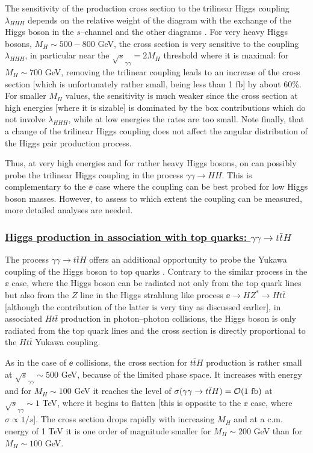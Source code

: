 The sensitivity of the production cross section to the trilinear Higgs coupling
$\lambda_{HHH}$ depends on the relative weight of the diagram with the exchange
of the Higgs boson in the $s$--channel and the other diagrams
\cite{gam-HH1}. For very heavy
Higgs bosons, $M_H \sim 500-800$ GeV, the cross section is very sensitive to the
coupling $\lambda_{HHH}$, in particular near the $\sqrt{s}_{\gamma \gamma} =2
M_H$ threshold where it is maximal: for $M_H \sim 700$ GeV, removing the
trilinear coupling leads to an increase of the cross section [which is
unfortunately rather small, being less than 1 fb] by about 60\%.  For smaller
$M_H$ values, the sensitivity is much weaker since the cross section at high
energies [where it is sizable] is dominated by the box contributions which do
not involve $\lambda_{HHH}$, while at low energies the rates are too small. 
Note finally, that a change of the trilinear Higgs coupling does not affect the
angular distribution of the Higgs pair production process. \s

Thus, at very high energies and for rather heavy Higgs bosons, on can  possibly
probe the trilinear Higgs coupling in the process $\gamma \gamma \to HH$. This
is complementary to the $\ee$ case where the coupling can be best probed for
low Higgs boson masses. However, to assess to which extent the coupling can be
measured, more detailed analyses are needed.  

\subsubsection*{\underline{Higgs production in association with top quarks: 
$\gamma \gamma \to t\bar{t} H$}}

The process $\gamma \gamma \to t\bar{t}H$ offers an additional opportunity to
probe the Yukawa coupling of the Higgs boson to top quarks 
\cite{gam-ttH,gam-ttH0}. Contrary to the
similar process in the $\ee$ case, where the Higgs boson can be radiated not 
only from the top quark lines but also from the $Z$ line in the Higgs strahlung
like process $\ee \to HZ^* \to Ht\bar{t}$ [although the  contribution of the
latter is very tiny as discussed earlier], in associated $Ht\bar{t}$ 
production in photon--photon collisions, the Higgs boson is only radiated 
from the top quark lines and the cross section is directly proportional to
the $Ht\bar{t}$ Yukawa coupling. \s

As in the case of $\ee$ collisions, the cross section for $t\bar{t}H$
production is rather small at $\sqrt{s}_{\gamma  \gamma} \sim 500$  GeV,
because of the limited phase space. It increases with energy and for $M_H \sim
100$ GeV it reaches the level of $\sigma (\gamma \gamma \to t\bar{t}H) = {\cal
O}(1~{\rm fb})$ at $\sqrt{s}_{\gamma \gamma} \sim 1$ TeV, where it begins to
flatten [this is opposite to the $\ee$ case, where $\sigma \propto 1/s$]. The 
cross section drops rapidly with increasing $M_H$ and
at a c.m. energy of 1 TeV it is one order of magnitude smaller for $M_H \sim
200$ GeV than for $M_H \sim 100$ GeV. \s

